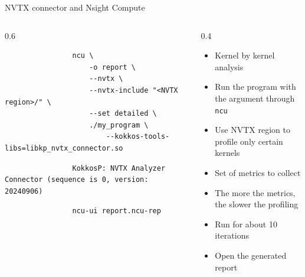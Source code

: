 \documentclass[
    aspectratio=169,
]{beamer}
\begin{document}
\begin{frame}[fragile]{NVTX connector and Nsight Compute}
    \begin{columns}
        \begin{column}{0.6\linewidth}
            \begin{verbatim}
                ncu \
                    -o report \
                    --nvtx \
                    --nvtx-include "<NVTX region>/" \
                    --set detailed \
                    ./my_program \
                        --kokkos-tools-libs=libkp_nvtx_connector.so
            \end{verbatim}

            \begin{verbatim}
                KokkosP: NVTX Analyzer Connector (sequence is 0, version: 20240906)
            \end{verbatim}

            \begin{verbatim}
                ncu-ui report.ncu-rep
            \end{verbatim}
        \end{column}
        \begin{column}{0.4\linewidth}
            \begin{itemize}
                \item Kernel by kernel analysis
                \item Run the program with the argument through \texttt{ncu}
                \item Use NVTX region to profile only certain kernels
                \item Set of metrics to collect
                \item The more the metrics, the slower the profiling
                \item Run for about 10 iterations
                \item Open the generated report
            \end{itemize}
        \end{column}
    \end{columns}
\end{frame}
\end{document}
